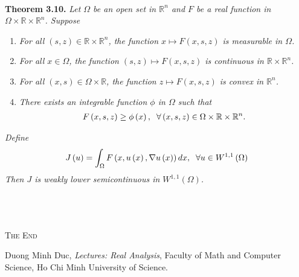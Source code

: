 \documentclass[a4paper]{article}
\numberwithin{equation}{section}
\begin{document}
\\
\textbf{Theorem 3.10.} \textit{Let $\Omega$ be an open set in $\mathbb{R}^n$ and $F$ be a real function in $\Omega  \times \mathbb{R} \times {\mathbb{R}^n}$. Suppose}
\begin{enumerate}
\item \textit{For all $\left( {s,z} \right) \in \mathbb{R} \times {\mathbb{R}^n}$, the function $x \mapsto F\left( {x,s,z} \right)$ is measurable in $\Omega$.}
\item \textit{For all $x\in \Omega$, the function $\left( {s,z} \right) \mapsto F\left( {x,s,z} \right)$ is continuous in $\mathbb{R} \times {\mathbb{R}^n}$.}
\item \textit{For all $\left( {x,s} \right) \in \Omega  \times \mathbb{R}$, the function $z \mapsto F\left( {x,s,z} \right)$ is convex in $\mathbb{R}^n$.}
\item \textit{There exists an integrable function $\phi$ in $\Omega$ such that}
\begin{align}
F\left( {x,s,z} \right) \ge \phi \left( x \right),\hspace{0.2cm}\forall \left( {x,s,z} \right) \in \Omega  \times \mathbb{R} \times {\mathbb{R}^n}.
\end{align}
\end{enumerate}
\textit{Define}
\begin{align}
J\left( u \right) = \int_\Omega  {F\left( {x,u\left( x \right),\nabla u\left( x \right)} \right)dx} ,\hspace{0.2cm}\forall u \in {W^{1,1}}\left( \Omega  \right)
\end{align}
\textit{Then $J$ is weakly lower semicontinuous in $W^{1,1}\left(\Omega\right)$.}\\
\\
\\
\\
\begin{center}
\textsc{The End}
\end{center}
\newpage
\printindex
\newpage
\begin{thebibliography}{999}
 Duong Minh Duc, \textit{Lectures: Real Analysis}, Faculty of Math and Computer Science, Ho Chi Minh University of Science.
\end{thebibliography}
\end{document}
